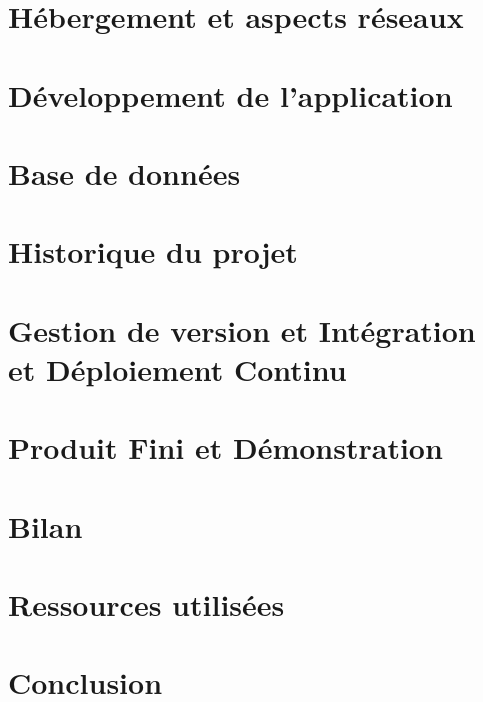 \documentclass[12pt, a4paper, oneside]{article}
\begin{document}
    \section{Hébergement et aspects réseaux}\label{sec:hebergement-et-aspects-reseaux}
    


    \section{Développement de l'application}\label{sec:developpement-de-l'application}
    


    \section{Base de données}\label{sec:base-de-données}
    


    \section{Historique du projet}\label{sec:historique-du-projet}
    


    \section{Gestion de version et Intégration et Déploiement Continu}\label{sec:gestion-de-version-et-integration/-deploiement-continu}
    


    \section{Produit Fini et Démonstration}\label{sec:produit-fini-et-demonstration}
    


    \section{Bilan}\label{sec:bilan}
    


    \section{Ressources utilisées}\label{sec:ressources-utilisee}
    


    \section{Conclusion}\label{sec:conclusion}
\end{document}
